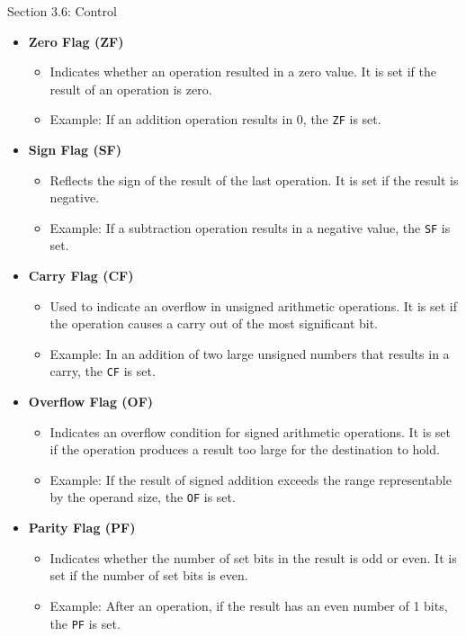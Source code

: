 \begin{notes}{Section 3.6: Control}
    \begin{itemize}
        \item \textbf{Zero Flag (ZF)}
        \begin{itemize}
            \item Indicates whether an operation resulted in a zero value. It is set if the result of an operation is zero.
            \item Example: If an addition operation results in 0, the \texttt{ZF} is set.
        \end{itemize}
        \item \textbf{Sign Flag (SF)}
        \begin{itemize}
            \item Reflects the sign of the result of the last operation. It is set if the result is negative.
            \item Example: If a subtraction operation results in a negative value, the \texttt{SF} is set.
        \end{itemize}
        \item \textbf{Carry Flag (CF)}
        \begin{itemize}
            \item Used to indicate an overflow in unsigned arithmetic operations. It is set if the operation causes a carry out of the most significant bit.
            \item Example: In an addition of two large unsigned numbers that results in a carry, the \texttt{CF} is set.
        \end{itemize}
        \item \textbf{Overflow Flag (OF)}
        \begin{itemize}
            \item Indicates an overflow condition for signed arithmetic operations. It is set if the operation produces a result too large for the destination to hold.
            \item Example: If the result of signed addition exceeds the range representable by the operand size, the \texttt{OF} is set.
        \end{itemize}
        \item \textbf{Parity Flag (PF)}
        \begin{itemize}
            \item Indicates whether the number of set bits in the result is odd or even. It is set if the number of set bits is even.
            \item Example: After an operation, if the result has an even number of 1 bits, the \texttt{PF} is set.
        \end{itemize}
    \end{itemize}
    

\end{notes}
